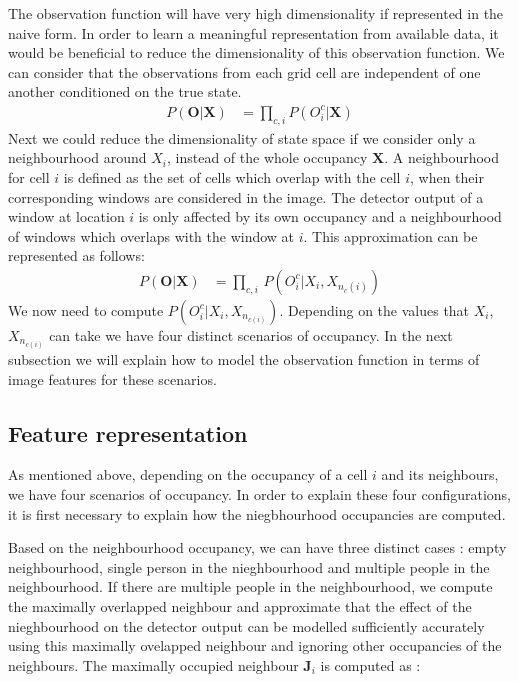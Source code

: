 \documentclass[10pt,twocolumn,letterpaper]{article}
\newcommand{\obs}{\mathbf{O}}
\newcommand{\state}{\mathbf{X}}
\begin{document}
The observation function will have very high dimensionality if represented in the naive form. In order to learn a meaningful representation from available data, it would be beneficial to reduce the dimensionality of this observation function.
We can consider that the observations from each grid cell are independent of one another conditioned on the true state.
\begin{align}
P(\textbf{O}|\textbf{X})&=\prod_{c,i} {P(O_{i}^{c}|\textbf{X})}
\end{align}
Next we could reduce the dimensionality of state space if we consider only a neighbourhood around $ X_{i} $, instead of the whole occupancy $\textbf{X} $. A neighbourhood for cell $i$ is defined as the set of cells which overlap with the cell $i$, when their corresponding windows are considered in the image. The detector output of a window at location $ i $ is only affected by its own occupancy and a neighbourhood of windows which overlaps with the window at $ i$. This approximation can be represented as follows: 
\begin{align}
  P(\obs|\state) &= \prod_{c,i} \, P(O_{i}^{c}|X_{i},X_{n_{c}(i)})
\end{align}
We now need to compute  $ P(O_{i}^{c}|X_{i},X_{n_{c(i)}}) $. Depending on the values that $ X_{i} $, $ X_{n_{c(i)}} $ can take we have four distinct scenarios of occupancy. In the next subsection we will explain how to model the observation function in terms of image features for these scenarios.

\subsection{Feature representation}
As mentioned above, depending on the occupancy of a cell $i$ and its neighbours, we have four scenarios of occupancy. In order to explain these four configurations, it is first necessary to explain how the niegbhourhood occupancies are computed.

Based on the neighbourhood occupancy, we can have three distinct cases : empty neighbourhood, single person in the nieghbourhood and multiple people in the neighbourhood. If there are multiple people in the neighbourhood, we compute the maximally overlapped neighbour and approximate that the effect of the nieghbourhood on the detector output can be modelled sufficiently accurately using this maximally ovelapped neighbour and ignoring other occupancies of the neighbours. The maximally occupied neighbour $ \textbf{J}_{i} $ is computed as :
\end{document}
